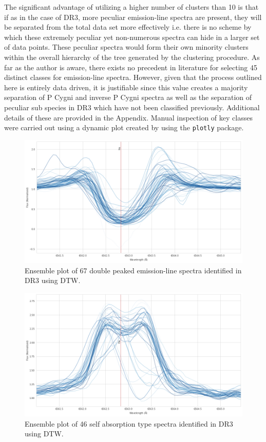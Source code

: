 The significant advantage of utilizing a higher number of clusters than 10 is that if as in the case of DR3, more peculiar emission-line spectra are present, they will be separated from the total data set more effectively i.e. there is no scheme by which these extremely peculiar yet non-numerous spectra can hide in a larger set of data points. These peculiar spectra would form their own minority clusters within the overall hierarchy of the tree generated by the clustering procedure. As far as the author is aware, there exists no precedent in literature for selecting 45 distinct classes for emission-line spectra. However, given that the process outlined here is entirely data driven, it is justifiable since this value creates a majority separation of P Cygni and inverse P Cygni spectra as well as the separation of peculiar sub species in DR3 which have not been classified previously. Additional details of these are provided in the Appendix. Manual inspection of key classes were carried out using a dynamic plot created by using the \texttt{plotly} package.

\begin{figure}[!htb]
\centering
\includegraphics[scale=0.45]{figures/double peak 1.png}
\caption{Ensemble plot of 67 double peaked emission-line spectra identified in DR3 using DTW.}
\end{figure}

\begin{figure}[!htb]
\centering
\includegraphics[scale=0.45]{figures/emission on abs.png}
\caption{Ensemble plot of 46 self absorption type spectra identified in DR3 using DTW.}
\end{figure}

